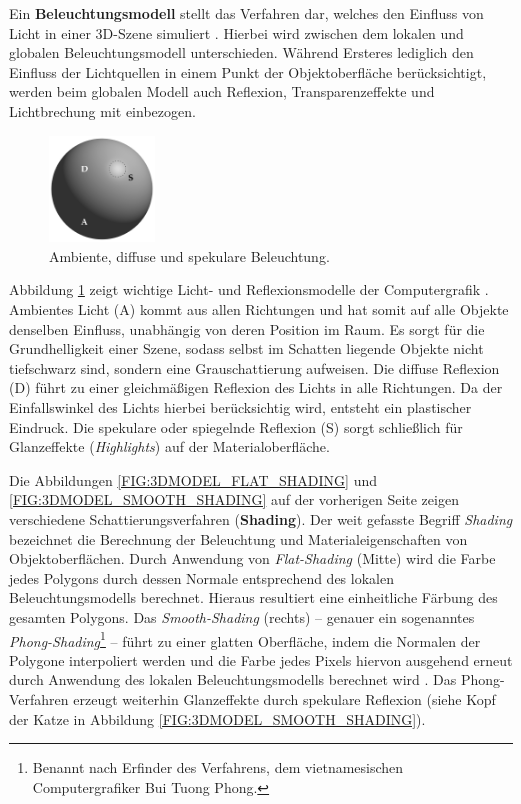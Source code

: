 Ein \textbf{Beleuchtungsmodell} stellt das Verfahren dar, welches den Einfluss von Licht in einer 3D-Szene simuliert \autocite[190\psq]{Zeppenfeld:2004}. Hierbei wird zwischen dem lokalen und globalen Beleuchtungsmodell unterschieden. Während Ersteres lediglich den Einfluss der Lichtquellen in einem Punkt der Objektoberfläche berücksichtigt, werden beim globalen Modell auch Reflexion, Transparenzeffekte und Lichtbrechung mit einbezogen.

\begin{figure}[ht]
	\centering
	\includegraphics[width=0.25\textwidth]{kap2/figures/illumination-crop.pdf}
	\caption{Ambiente, diffuse und spekulare Beleuchtung.}
	\label{FIG:ILLUMINATION}
\end{figure}

Abbildung \ref{FIG:ILLUMINATION} zeigt wichtige Licht- und Reflexionsmodelle der Computergrafik \autocite[722\psq]{Foley:CG_PRINCIPLES_AND_PRACTICE}. Ambientes Licht (A) kommt aus allen Richtungen und hat somit auf alle Objekte denselben Einfluss, unabhängig von deren Position im Raum. Es sorgt für die Grundhelligkeit einer Szene, sodass selbst im Schatten liegende Objekte nicht tiefschwarz sind, sondern eine Grauschattierung aufweisen. Die diffuse Reflexion (D) führt zu einer gleichmäßigen Reflexion des Lichts in alle Richtungen. Da der Einfallswinkel des Lichts hierbei berücksichtig wird, entsteht ein plastischer Eindruck. Die spekulare oder spiegelnde Reflexion (S) sorgt schließlich für Glanzeffekte (\emph{Highlights}) auf der Materialoberfläche.

Die Abbildungen \ref{FIG:3DMODEL_FLAT_SHADING} und \ref{FIG:3DMODEL_SMOOTH_SHADING} auf der vorherigen Seite zeigen verschiedene Schattierungsverfahren (\textbf{Shading}). Der weit gefasste Begriff \emph{Shading} bezeichnet die Berechnung der Beleuchtung und Materialeigenschaften von Objektoberflächen. Durch Anwendung von \emph{Flat-Shading} (Mitte) wird die Farbe jedes Polygons durch dessen Normale entsprechend des lokalen Beleuchtungsmodells berechnet. Hieraus resultiert eine einheitliche Färbung des gesamten Polygons. Das \emph{Smooth-Shading} (rechts) -- genauer ein sogenanntes \emph{Phong-Shading}\footnote{Benannt nach Erfinder des Verfahrens, dem vietnamesischen Computergrafiker Bui Tuong Phong.} -- führt zu einer glatten Oberfläche, indem die Normalen der Polygone interpoliert werden und die Farbe jedes Pixels hiervon ausgehend erneut durch Anwendung des lokalen Beleuchtungsmodells berechnet wird \autocite[203\psq]{Zeppenfeld:2004}. Das Phong-Verfahren erzeugt weiterhin Glanzeffekte durch spekulare Reflexion (siehe Kopf der Katze in Abbildung \ref{FIG:3DMODEL_SMOOTH_SHADING}).

